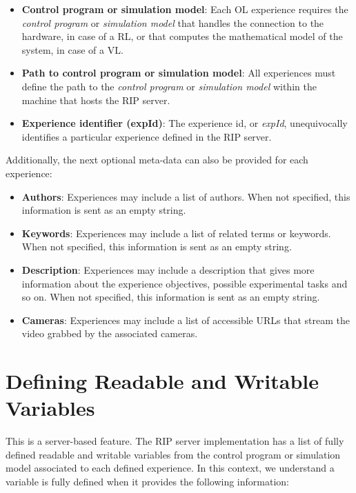 \begin{itemize}
    \item \textbf{Control program or simulation model}: Each OL experience requires the \textit{control program} or \textit{simulation model} that handles the connection to the hardware, in case of a RL, or that computes the mathematical model of the system, in case of a VL.
    \item \textbf{Path to control program or simulation model}: All experiences must define the path to the \textit{control program} or \textit{simulation model} within the machine that hosts the RIP server.
    \item \textbf{Experience identifier (expId)}: The experience id, or \textit{expId}, unequivocally identifies a particular experience defined in the RIP server.
\end{itemize}

Additionally, the next optional meta-data can also be provided for each experience:

\begin{itemize}
    \item \textbf{Authors}: Experiences may include a list of authors. When not specified, this information is sent as an empty string.
    \item \textbf{Keywords}: Experiences may include a list of related terms or keywords. When not specified, this information is sent as an empty string.
    \item \textbf{Description}: Experiences may include a description that gives more information about the experience objectives, possible experimental tasks and so on. When not specified, this information is sent as an empty string.
    \item \textbf{Cameras}: Experiences may include a list of accessible URLs that stream the video grabbed by the associated cameras.
\end{itemize}

\section{Defining Readable and Writable Variables}
This is a server-based feature. The RIP server implementation has a list of fully defined readable and writable variables from the control program or simulation model associated to each defined experience. In this context, we understand a variable is fully defined when it provides the following information:

